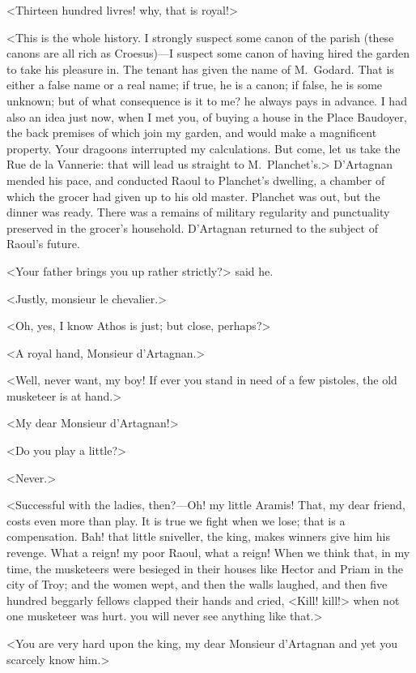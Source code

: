 <Thirteen hundred livres! why, that is royal!>

<This is the whole history. I strongly suspect some canon of the parish (these canons are all rich as Croesus)—I suspect some canon of having hired the garden to take his pleasure in. The tenant has given the name of M.~Godard. That is either a false name or a real name; if true, he is a canon; if false, he is some unknown; but of what consequence is it to me? he always pays in advance. I had also an idea just now, when I met you, of buying a house in the Place Baudoyer, the back premises of which join my garden, and would make a magnificent property. Your dragoons interrupted my calculations. But come, let us take the Rue de la Vannerie: that will lead us straight to M.~Planchet's.> D'Artagnan mended his pace, and conducted Raoul to Planchet's dwelling, a chamber of which the grocer had given up to his old master. Planchet was out, but the dinner was ready. There was a remains of military regularity and punctuality preserved in the grocer's household. D'Artagnan returned to the subject of Raoul's future.

<Your father brings you up rather strictly?> said he.

<Justly, monsieur le chevalier.>

<Oh, yes, I know Athos is just; but close, perhaps?>

<A royal hand, Monsieur d'Artagnan.>

<Well, never want, my boy! If ever you stand in need of a few pistoles, the old musketeer is at hand.>

<My dear Monsieur d'Artagnan!>

<Do you play a little?>

<Never.>

<Successful with the ladies, then?—Oh! my little Aramis! That, my dear friend, costs even more than play. It is true we fight when we lose; that is a compensation. Bah! that little sniveller, the king, makes winners give him his revenge. What a reign! my poor Raoul, what a reign! When we think that, in my time, the musketeers were besieged in their houses like Hector and Priam in the city of Troy; and the women wept, and then the walls laughed, and then five hundred beggarly fellows clapped their hands and cried, <Kill! kill!> when not one musketeer was hurt.  you will never see anything like that.>

<You are very hard upon the king, my dear Monsieur d'Artagnan and yet you scarcely know him.>

